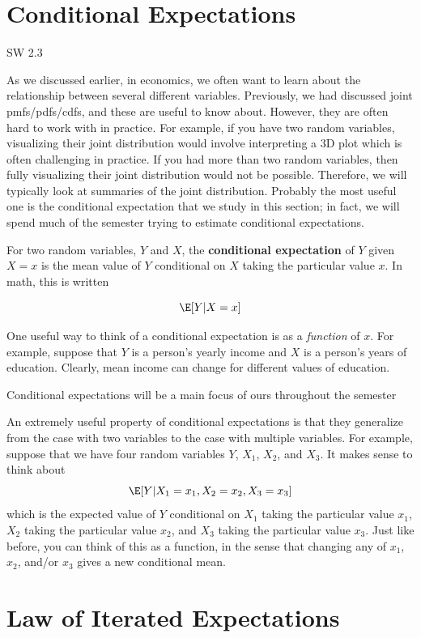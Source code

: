 \documentclass[
  letterpaper,
  DIV=11,
  numbers=noendperiod]{scrreprt}
\begin{document}
\section{Conditional Expectations}\label{conditional-expectations}

SW 2.3

As we discussed earlier, in economics, we often want to learn about the
relationship between several different variables. Previously, we had
discussed joint pmfs/pdfs/cdfs, and these are useful to know about.
However, they are often hard to work with in practice. For example, if
you have two random variables, visualizing their joint distribution
would involve interpreting a 3D plot which is often challenging in
practice. If you had more than two random variables, then fully
visualizing their joint distribution would not be possible. Therefore,
we will typically look at summaries of the joint distribution. Probably
the most useful one is the conditional expectation that we study in this
section; in fact, we will spend much of the semester trying to estimate
conditional expectations.

For two random variables, \(Y\) and \(X\), the \textbf{conditional
expectation} of \(Y\) given \(X=x\) is the mean value of \(Y\)
conditional on \(X\) taking the particular value \(x\). In math, this is
written

\[
  \E[Y|X=x]
\]

One useful way to think of a conditional expectation is as a
\emph{function} of \(x\). For example, suppose that \(Y\) is a person's
yearly income and \(X\) is a person's years of education. Clearly, mean
income can change for different values of education.

Conditional expectations will be a main focus of ours throughout the
semester

An extremely useful property of conditional expectations is that they
generalize from the case with two variables to the case with multiple
variables. For example, suppose that we have four random variables
\(Y\), \(X_1\), \(X_2\), and \(X_3\). It makes sense to think about \[
  \E[Y|X_1=x_1, X_2=x_2, X_3=x_3]
\] which is the expected value of \(Y\) conditional on \(X_1\) taking
the particular value \(x_1\), \(X_2\) taking the particular value
\(x_2\), and \(X_3\) taking the particular value \(x_3\). Just like
before, you can think of this as a function, in the sense that changing
any of \(x_1\), \(x_2\), and/or \(x_3\) gives a new conditional mean.

\section{Law of Iterated
Expectations}\label{law-of-iterated-expectations}
\end{document}
